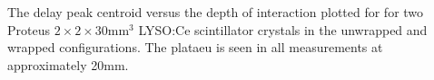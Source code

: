 \label{fig:centroidposition} The delay peak centroid versus the depth of interaction plotted for
for two Proteus $2\times2\times30$mm$^3$ LYSO:Ce scintillator crystals in the unwrapped and wrapped configurations. The plataeu is seen in all measurements at approximately 20mm.